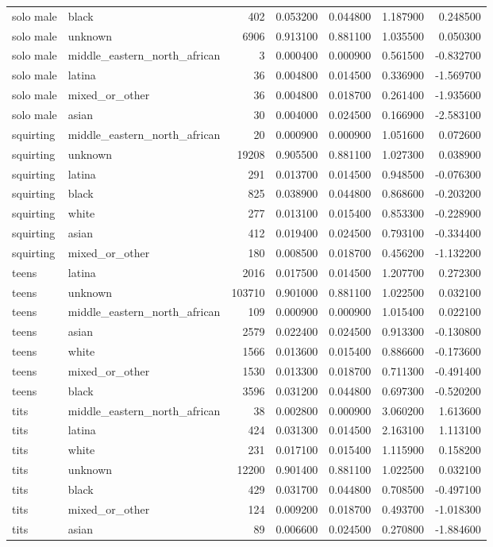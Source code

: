 \begin{tabular}{llrrrrr}
solo male & black & 402 & 0.053200 & 0.044800 & 1.187900 & 0.248500 \\
solo male & unknown & 6906 & 0.913100 & 0.881100 & 1.035500 & 0.050300 \\
solo male & middle_eastern_north_african & 3 & 0.000400 & 0.000900 & 0.561500 & -0.832700 \\
solo male & latina & 36 & 0.004800 & 0.014500 & 0.336900 & -1.569700 \\
solo male & mixed_or_other & 36 & 0.004800 & 0.018700 & 0.261400 & -1.935600 \\
solo male & asian & 30 & 0.004000 & 0.024500 & 0.166900 & -2.583100 \\
squirting & middle_eastern_north_african & 20 & 0.000900 & 0.000900 & 1.051600 & 0.072600 \\
squirting & unknown & 19208 & 0.905500 & 0.881100 & 1.027300 & 0.038900 \\
squirting & latina & 291 & 0.013700 & 0.014500 & 0.948500 & -0.076300 \\
squirting & black & 825 & 0.038900 & 0.044800 & 0.868600 & -0.203200 \\
squirting & white & 277 & 0.013100 & 0.015400 & 0.853300 & -0.228900 \\
squirting & asian & 412 & 0.019400 & 0.024500 & 0.793100 & -0.334400 \\
squirting & mixed_or_other & 180 & 0.008500 & 0.018700 & 0.456200 & -1.132200 \\
teens & latina & 2016 & 0.017500 & 0.014500 & 1.207700 & 0.272300 \\
teens & unknown & 103710 & 0.901000 & 0.881100 & 1.022500 & 0.032100 \\
teens & middle_eastern_north_african & 109 & 0.000900 & 0.000900 & 1.015400 & 0.022100 \\
teens & asian & 2579 & 0.022400 & 0.024500 & 0.913300 & -0.130800 \\
teens & white & 1566 & 0.013600 & 0.015400 & 0.886600 & -0.173600 \\
teens & mixed_or_other & 1530 & 0.013300 & 0.018700 & 0.711300 & -0.491400 \\
teens & black & 3596 & 0.031200 & 0.044800 & 0.697300 & -0.520200 \\
tits & middle_eastern_north_african & 38 & 0.002800 & 0.000900 & 3.060200 & 1.613600 \\
tits & latina & 424 & 0.031300 & 0.014500 & 2.163100 & 1.113100 \\
tits & white & 231 & 0.017100 & 0.015400 & 1.115900 & 0.158200 \\
tits & unknown & 12200 & 0.901400 & 0.881100 & 1.022500 & 0.032100 \\
tits & black & 429 & 0.031700 & 0.044800 & 0.708500 & -0.497100 \\
tits & mixed_or_other & 124 & 0.009200 & 0.018700 & 0.493700 & -1.018300 \\
tits & asian & 89 & 0.006600 & 0.024500 & 0.270800 & -1.884600 \\
\bottomrule
\end{tabular}
